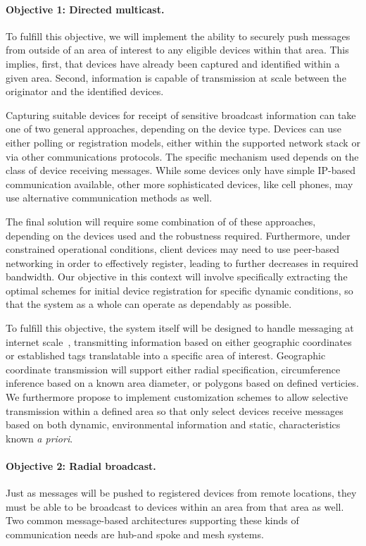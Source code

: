 \documentclass{sbir}
\begin{document}
\paragraph{Objective 1: Directed multicast.} To fulfill this objective, we will implement the ability to securely push messages from outside of an area of interest to any eligible devices within that area. This implies, first, that devices have already been captured and identified within a given area. Second, information is capable of transmission at scale between the originator and the identified devices.

Capturing suitable devices for receipt of sensitive broadcast information can take one of two general approaches, depending on the device type. Devices can use either polling or registration models, either within the supported network stack or via other communications protocols. The specific mechanism used depends on the class of device receiving messages. While some devices only have simple IP-based communication available, other more sophisticated devices, like cell phones, may use alternative communication methods as well. 

The final solution will require some combination of of these approaches, depending on the devices used and the robustness required. Furthermore, under constrained operational conditions, client devices may need to use peer-based networking in order to effectively register, leading to further decreases in required bandwidth. Our objective in this context will involve specifically extracting the optimal schemes for initial device registration for specific dynamic conditions, so that the system as a whole can operate as dependably as possible.

To fulfill this objective, the system itself will be designed to handle messaging at internet scale~\cite{LiPoClGePrNuRo:12,LlFrKaAn:11,KrPaFrMa:12}, transmitting information based on either geographic coordinates or established tags translatable into a specific area of interest. Geographic coordinate transmission will support either radial specification, circumference inference based on a known area diameter, or polygons based on defined verticies. We furthermore propose to implement customization schemes to allow selective transmission within a defined area so that only select devices receive messages based on both dynamic, environmental information and static, characteristics known {\sl a priori}.

\paragraph{Objective 2: Radial broadcast.} Just as messages will be pushed to registered devices from remote locations, they must be able to be broadcast to devices within an area from that area as well. Two common message-based architectures supporting these kinds of communication needs are hub-and spoke and mesh systems. 
\end{document}
